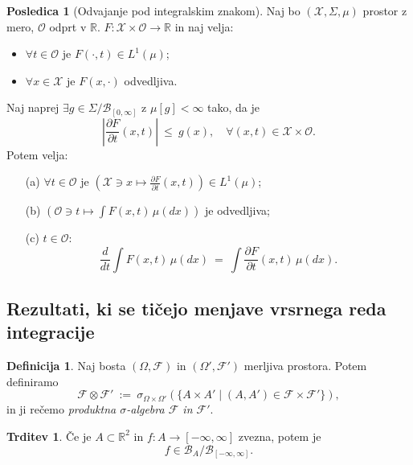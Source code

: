 \documentclass[11pt]{article}
\newcommand{\R}{\mathbb{R}}
\newcommand{\F}{\mathcal{F}}
\newcommand{\X}{\mathcal{X}}
\renewcommand{\O}{\mathcal{O}}
\renewcommand{\L}{L}
\newcommand{\B}{\mathscr{B}}
\newcommand{\set}[1]{\{#1\}}
\newcommand{\oklepaj}[1]{\left(#1\right)}
\newcommand{\1}{\mathbbm{1}}
\newcommand{\rr}{[-\infty,\infty]}
\theoremstyle{definition}
\newtheorem{definicija}{Definicija}[section]
\theoremstyle{definition}
\newtheorem{trditev}{Trditev}[section]
\theoremstyle{definition}
\theoremstyle{definition}
\newtheorem*{posledica}{Posledica}
\begin{document}
\begin{posledica}[Odvajanje pod integralskim znakom]

Naj bo $(\X, \Sigma, \mu)$ prostor z mero, $\O$ odprt v $\R$. $F: \X \times \O \rightarrow \R$ in naj velja:
\begin{itemize}
	\item $\forall t \in \O$ je $F(\cdot,t) \in \L^1(\mu)$;
	\item $\forall x \in \X$ je $F(x,\cdot)$ odvedljiva.
\end{itemize}
Naj naprej $\exists g \in \Sigma/\B_{[0,\infty]}$ z $\mu[g]<\infty$ tako, da je
$$\left|\frac{\partial F}{\partial t}(x,t)\right| ~\leq~ g(x), \quad \forall (x,t) \in \X \times \O.$$
Potem velja:
\begin{enumerate}
	\item[(a)] $\forall t \in \O$ je $\oklepaj{\X \ni x \mapsto \frac{\partial F}{\partial t}(x,t)} \in \L^1(\mu)$;
	\item[(b)] $\oklepaj{\O \ni t \mapsto \int F(x,t) \,\mu(dx)}$ je odvedljiva;
	\item[(c)] $t \in \O$:
	$$\frac{d}{dt} \int F(x,t) \,\mu(dx) ~=~ \int \frac{\partial F}{\partial t}(x,t)\,\mu(dx).$$
\end{enumerate}

\end{posledica}
\vspace{0.5cm}


\subsection{Rezultati, ki se tičejo menjave vrsrnega reda \\integracije}
\vspace{0.5cm}

\begin{definicija}

Naj bosta $(\Omega, \F)$ in $(\Omega', \F')$ merljiva prostora. Potem definiramo
$$\F \otimes \F' ~:=~ \sigma_{\Omega\times\Omega'} \oklepaj{\set{A \times A' \mid (A,A') \in \F\times\F'}},$$
in ji rečemo \textit{produktna $\sigma$-algebra $\F$ in $\F'$}.

\end{definicija}
\vspace{0.5cm}

\begin{trditev}

Če je $A \subset \R^2$ in $f: A \rightarrow \rr$ zvezna, potem  je 
$$f \in \B_A/\B_{\rr}.$$

\end{trditev}
\vspace{0.5cm}
\end{document}
